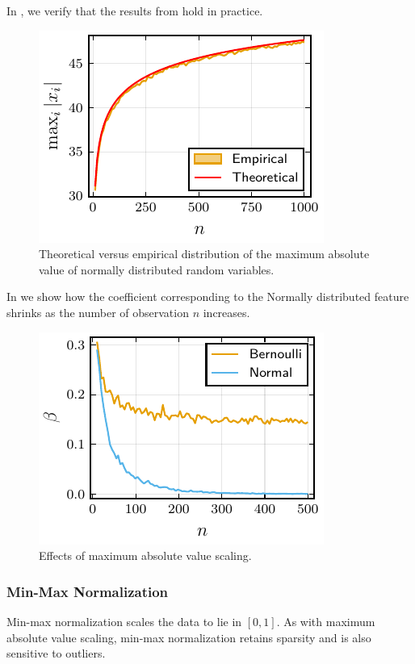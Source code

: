 In , we verify that the results from  hold in practice.

\begin{figure}[htpb]
  \centering
  \includegraphics[]{plots/maxabs_gev.pdf}
  \caption{%
    Theoretical versus empirical distribution of the maximum absolute value of normally distributed random variables.
  }
  \label{fig:maxabs-gev}
\end{figure}

In  we show how the coefficient corresponding to the Normally distributed feature shrinks as the number of observation \(n\) increases.

\begin{figure}[htpb]
  \centering
  \includegraphics[]{plots/maxabs_n.pdf}
  \caption{%
    Effects of maximum absolute value scaling.
  }
  \label{fig:maxabs-n}
\end{figure}

\subsubsection{Min-Max Normalization}

Min-max normalization scales the data to lie in \([0, 1]\). As with maximum absolute value scaling, min-max normalization retains sparsity and is also sensitive to outliers.

